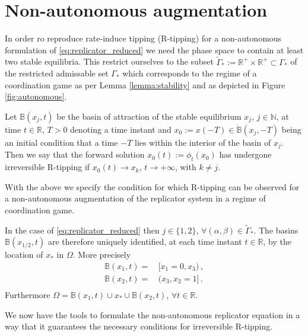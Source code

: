 \documentclass[../main.tex]{subfiles}
\begin{document}
\section{Non-autonomous augmentation}\label{sec:nonautonomous_augmentation}

In order ro reproduce rate-induce tipping (R-tipping) for a non-autonomous formulation of \eqref{eq:replicator_reduced} we need the phase space to contain at least two stable equilibria.
This restrict ourselves to the subset $\tilde{\Gamma}_{*}:=\mathbb{R}^{+}\times \mathbb{R}^{+}\subset\Gamma_{*}$ of the restricted admissable set $\Gamma_{*}$ which corresponds to the regime of a coordination game as per Lemma \ref{lemma:stability} and as depicted in Figure \ref{fig:autonomous}.

\begin{definition}\label{def:r_tipping}
        Let $\mathbb{B}(x_{j},t)$ be the basin of attraction of the stable equilibrium $x_{j}$, $j\in\mathbb{N}$, at time $t\in \mathbb{R}$, $T>0$ denoting a time instant and $x_{0} := x(-T) \in \mathring{\mathbb{B}}(x_{j},-T)$ being an initial condition that a time $-T$ lies within the interior of the basin of $x_{j}$. 
        Then we say that the forward solution $x_{0}(t):=\phi_{t}(x_{0})$ has undergone irreversible R-tipping if $x_{0}(t)\to x_{k}$, $t\to+\infty$, with $k\neq j$.
\end{definition}

With the above we specify the condition for which R-tipping can be observed for a non-autonomous augmentation of the replicator system in a regime of coordination game.

\begin{observation}\label{obs:r_tipping_replicator}
        In the case of \eqref{eq:replicator_reduced} then $j\in\{1,2\}$, $\forall(\alpha,\beta)\in\tilde{\Gamma}_{*}$.
        The basins $\mathbb{B}(x_{1/2},t)$ are therefore uniquely identified, at each time instant $t\in \mathbb{R}$, by the location of $x_{*}$ in $\Omega$.
        More precisely
        \begin{align*}
                \mathbb{B}(x_{1},t) =&\, [x_{1}=0,x_{3})\,, \\
                \mathbb{B}(x_{2},t) =&\, (x_{3},x_{2}=1]\,. \\
        \end{align*}
        Furthermore $\Omega = \mathbb{B}(x_{1},t)\cup x_{*} \cup\mathbb{B}(x_{2},t)$, $\forall t\in \mathbb{R}$.
\end{observation}

We now have the tools to formulate the non-autonomous replicator equation in a way that it guarantees the necessary conditions for irreversible R-tipping.



\end{document}
